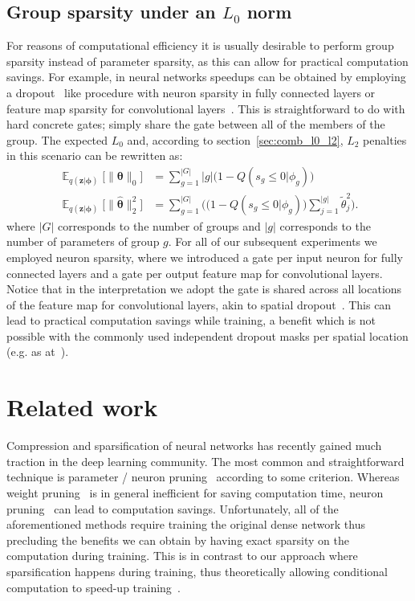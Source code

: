 \documentclass{article} %
\DeclareMathOperator{\E}{\mathbb{E}}
\def\!#1{\boldsymbol{#1}}
\def\*#1{\mathbf{#1}}
\begin{document}
\subsection{Group sparsity under an $L_0$ norm}
For reasons of computational efficiency it is usually desirable to perform group sparsity instead of parameter sparsity, as this can allow for practical computation savings. For example, in neural networks speedups can be obtained by employing a dropout~\citep{srivastava2014dropout} like procedure with neuron sparsity in fully connected layers or feature map sparsity for convolutional layers~\citep{wen2016learning,louizos2017bayesian,neklyudov2017structured}. This is straightforward to do with hard concrete gates; simply share the gate between all of the members of the group. The expected $L_0$ and, according to section~\ref{sec:comb_l0_l2}, $L_2$ penalties in this scenario can be rewritten as:
\begin{align}
    \E_{q(\*z|\!\phi)}\bigg[\|\!\theta\|_0\bigg] & = \sum_{g=1}^{|G|}|g|\bigg(1 - Q(s_g \leq 0|\phi_g)\bigg) \\ \E_{q(\*z|\!\phi)}\bigg[\|\hat{\!\theta}\|^2_2\bigg] &= \sum_{g=1}^{|G|}\bigg(\big(1 - Q(s_g \leq 0|\phi_g)\big)\sum_{j=1}^{|g|}\tilde{\theta}^2_j\bigg).
\end{align}
where $|G|$ corresponds to the number of groups and $|g|$ corresponds to the number of parameters of group $g$. 
For all of our subsequent experiments we employed neuron sparsity, where we introduced a gate per input neuron for fully connected layers and a gate per output feature map for convolutional layers. Notice that in the interpretation we adopt the gate is shared across all locations of the feature map for convolutional layers, akin to spatial dropout~\citep{tompson2015efficient}. This can lead to practical computation savings while training, a benefit which is not possible with the commonly used independent dropout masks per spatial location (e.g. as at~\cite{zagoruyko2016wide}).

\section{Related work}

Compression and sparsification of neural networks has recently gained much traction in the deep learning community. The most common and straightforward technique is parameter / neuron pruning~\citep{lecun1990optimal} according to some criterion. Whereas weight pruning~\citep{han2015deep,ullrich2017soft,molchanov2017variational} is in general inefficient for saving computation time, neuron pruning~\citep{wen2016learning,louizos2017bayesian,neklyudov2017structured} can lead to computation savings. Unfortunately, all of the aforementioned methods require training the original dense network thus precluding the benefits we can obtain by having exact sparsity on the computation during training. This is in contrast to our approach where sparsification happens during training, thus theoretically allowing conditional computation to speed-up training~\citep{bengio2013estimating,bengio2015conditional}. 
\end{document}
